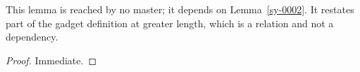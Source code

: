 
\begin{lemma}[Loose]\label{sy-0009}
This lemma is reached by no master; it depends on Lemma~\ref{sy-0002}. It restates part of the gadget definition at greater length, which is a relation and not a dependency.
\end{lemma}
\begin{proof}
Immediate.
\end{proof}
